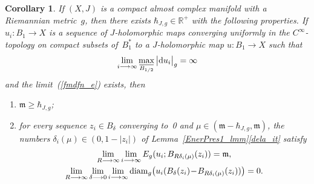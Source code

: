 \documentclass[11pt]{article}
\numberwithin{equation}{section}
\newtheorem{crl}[thm]{Corollary}
\theoremstyle{definition}
\def\eref#1{(\ref{#1})}
\def\ov#1{\overline{#1}}
\def\lra{\longrightarrow}
\def\fm{\mathfrak m}
\def\R{\mathbb R}
\def\de{\delta}
\def\i{\infty}
\def\hb{\hbar}
\def\diam{\textnormal{diam}}
\def\nd{\textnormal{d}}
\begin{document}
\begin{crl}\label{EnerPres2_crl}
If $(X,J)$ is a compact almost complex manifold with a Riemannian metric~$g$, 
then there exists $\hbar_{J,g}\!\in\!\R^+$ with the following properties.
If $u_i\!:B_1\!\lra\!X$ is a sequence of $J$-holomorphic maps converging
uniformly in the $C^{\i}$-topology on compact subsets of~$B_1^*$
to a $J$-holomorphic map $u\!:B_1\!\lra\!X$ such that 
$$\lim_{i\lra\i}\max_{\ov{B_{1/2}}}\big|\nd u_i\big|_g=\i$$
and the limit~\eref{fmdfn_e} exists, then %
\begin{enumerate}[label=(\arabic*),leftmargin=*]

\item\label{fmLowBnd_it} $\fm\ge\hb_{J,g}$;

\item\label{noLoss_it} for every sequence $z_i\!\in\!B_{\de}$ converging to~0 and
$\mu\!\in\!(\fm\!-\!\hb_{J,g},\fm)$, 
the numbers \hbox{$\de_i(\mu)\!\in\!(0,1\!-\!|z_i|)$} of Lemma~\ref{EnerPres1_lmm}\ref{dela_it} 
satisfy
\begin{gather}
\label{noEloss_e1} 
\lim_{R\lra\i}\lim_{i\lra\i}E_g(u_i;B_{R\de_i(\mu)}(z_i))=\fm,\\
\label{noEloss_e2} 
\lim_{R\lra\i}\lim_{\de\lra0}
\lim_{i\lra\i} \diam_g\big(u_i(B_{\de}(z_i)\!-\!B_{R\de_i(\mu)}(z_i))\big)=0.
\end{gather}

\end{enumerate}
\end{crl}
\end{document}
